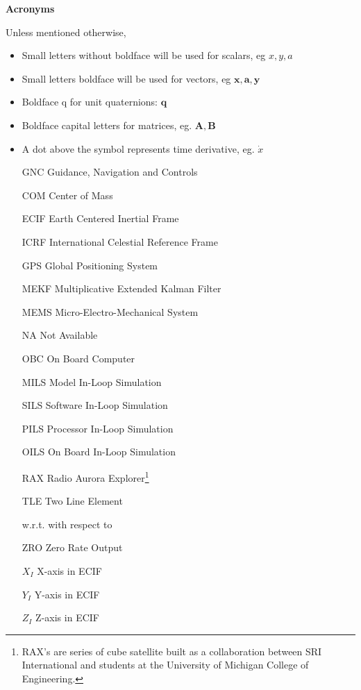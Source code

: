 \newpage
\thispagestyle{plain}
\begin{center}
    \Large{\textbf{Acronyms}}
\end{center}


Unless mentioned otherwise,
\begin{itemize}
    \item Small letters without boldface will be used for scalars, eg $x,y,a$
    \item Small letters boldface will be used for vectors, eg $\bm{x},\bm{a},\bm{y}$
    \item Boldface q for unit quaternions: $\bm{q}$
    \item Boldface capital letters for matrices, eg. $\bm{A},\bm{B}$
    \item A dot above the symbol represents time derivative, eg. $\dot{x}$
    \end{itemize}
    
    
\begin{itemize}[label={}]
\item [GNC] Guidance, Navigation and Controls
\item [COM] Center of Mass
\item [ECIF] Earth Centered Inertial Frame
\item [ICRF] International Celestial Reference Frame
\item[GPS] Global Positioning System 
\item[MEKF] Multiplicative Extended Kalman Filter
\item[MEMS] Micro-Electro-Mechanical System
\item[NA] Not Available
\item [OBC] On Board Computer
\item [MILS] Model In-Loop Simulation
\item [SILS] Software In-Loop Simulation
\item [PILS] Processor In-Loop Simulation
\item [OILS] On Board In-Loop Simulation
\item[RAX] Radio Aurora Explorer\footnote{RAX's are series of cube satellite built as a collaboration between SRI International and students at the University of Michigan College of Engineering.}
\item [TLE] Two Line Element
\item [w.r.t.] with respect to
\item[ZRO] Zero Rate Output
\item [$X_I$] X-axis in ECIF
\item [$Y_I$] Y-axis in ECIF
\item [$Z_I$] Z-axis in ECIF

\end{itemize}
